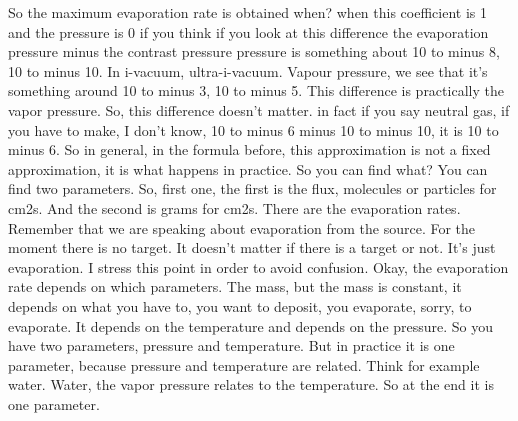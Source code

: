 So the maximum evaporation rate is obtained when? when this coefficient is 1 and the pressure is 0 if you think if you look at this difference the evaporation pressure minus the contrast pressure pressure is something about 10 to minus 8, 10 to minus 10. In i-vacuum, ultra-i-vacuum. Vapour pressure, we see that it's something around 10 to minus 3, 10 to minus 5. This difference is practically the vapor pressure. So, this difference doesn't matter. in fact if you say neutral gas, if you have to make, I don't know, 10 to minus 6 minus 10 to minus 10, it is 10 to minus 6. So in general, in the formula before, this approximation is not a fixed approximation, it is what happens in practice. So you can find what? You can find two parameters. So, first one, the first is the flux, molecules or particles for cm2s. And the second is grams for cm2s. There are the evaporation rates. Remember that we are speaking about evaporation from the source. For the moment there is no target. It doesn't matter if there is a target or not. It's just evaporation. I stress this point in order to avoid confusion. Okay, the evaporation rate depends on which parameters. The mass, but the mass is constant, it depends on what you have to, you want to deposit, you evaporate, sorry, to evaporate. It depends on the temperature and depends on the pressure. So you have two parameters, pressure and temperature. But in practice it is one parameter, because pressure and temperature are related. Think for example water. Water, the vapor pressure relates to the temperature. So at the end it is one parameter.
